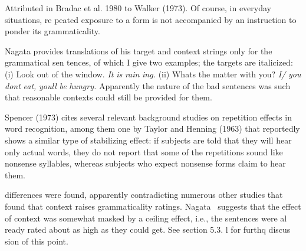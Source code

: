 \begin{listWWNumxxxiileveli}
\item 
\begin{styleStandard}
Attributed in Bradac et al. 1980 to Walker (1973). Of course, in everyday situations, re\- peated exposure to a form is not accompanied by an instruction to ponder its grammaticality.
\end{styleStandard}


\item 
\begin{styleStandard}
Nagata provides translations of his target and context strings only for the grammatical sen\- tences, of which I give two examples; the targets are italicized: (i) Look out of the window. \textit{It}\textit{ }\textit{is}\textit{ }\textit{rain\-}\textit{ }\textit{ing.}\textit{ }(ii) What{\textquotesingle}s the matter with you? \textit{I/}\textit{ }\textit{you}\textit{ }\textit{don{\textquotesingle}t}\textit{ }\textit{eat,}\textit{ }\textit{you{\textquotesingle}ll}\textit{ }\textit{be}\textit{ }\textit{hungry. }Apparently the nature of the bad sentences was such that reasonable contexts could still be provided for them.
\end{styleStandard}


\item 
\begin{styleStandard}
Spencer (1973) cites several relevant background studies on repetition effects in word recognition, among them one by Taylor and Henning (1963) that reportedly shows a similar type of stabilizing effect: if subjects are told that they will hear only actual words, they do not report that some of the repetitions sound like nonsense syllables, whereas subjects who expect nonsense forms claim to hear them.
\end{styleStandard}


\end{listWWNumxxxiileveli}
\clearpage\setcounter{page}{1}\begin{styleStandard}
differences were found, apparently contradicting numerous other studies that found that context raises grammaticality ratings. Nagata \ suggests that the effect of context was somewhat masked by a ceiling effect, i.e., the sentences were al\- ready rated about as high as they could get. See section 5.3. l for furthq discus\- sion of this point.
\end{styleStandard}


